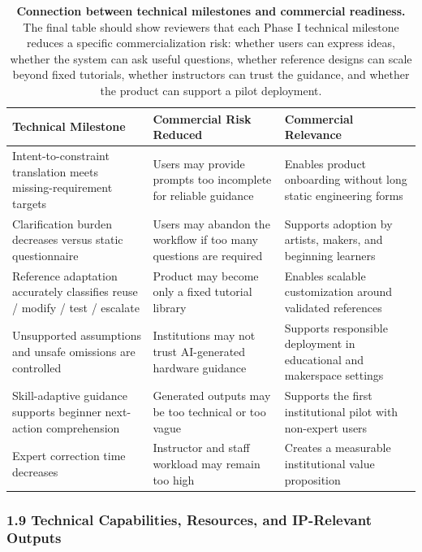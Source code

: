 \begin{table}[H]
\centering
\caption{\textbf{Connection between technical milestones and commercial readiness.} The final table should show reviewers that each Phase I technical milestone reduces a specific commercialization risk: whether users can express ideas, whether the system can ask useful questions, whether reference designs can scale beyond fixed tutorials, whether instructors can trust the guidance, and whether the product can support a pilot deployment.}
\label{tab:milestone_commercial}
\renewcommand{\arraystretch}{1.15}
\small
\begin{tabular}{p{} p{} p{}}
\hline
\textbf{Technical Milestone} & \textbf{Commercial Risk Reduced} & \textbf{Commercial Relevance} \\
\hline
Intent-to-constraint translation meets missing-requirement targets & Users may provide prompts too incomplete for reliable guidance & Enables product onboarding without long static engineering forms \\
\hline
Clarification burden decreases versus static questionnaire & Users may abandon the workflow if too many questions are required & Supports adoption by artists, makers, and beginning learners \\
\hline
Reference adaptation accurately classifies reuse / modify / test / escalate & Product may become only a fixed tutorial library & Enables scalable customization around validated references \\
\hline
Unsupported assumptions and unsafe omissions are controlled & Institutions may not trust AI-generated hardware guidance & Supports responsible deployment in educational and makerspace settings \\
\hline
Skill-adaptive guidance supports beginner next-action comprehension & Generated outputs may be too technical or too vague & Supports the first institutional pilot with non-expert users \\
\hline
Expert correction time decreases & Instructor and staff workload may remain too high & Creates a measurable institutional value proposition \\
\hline
\end{tabular}
\end{table}


\subsubsection*{1.9 Technical Capabilities, Resources, and IP-Relevant Outputs}

